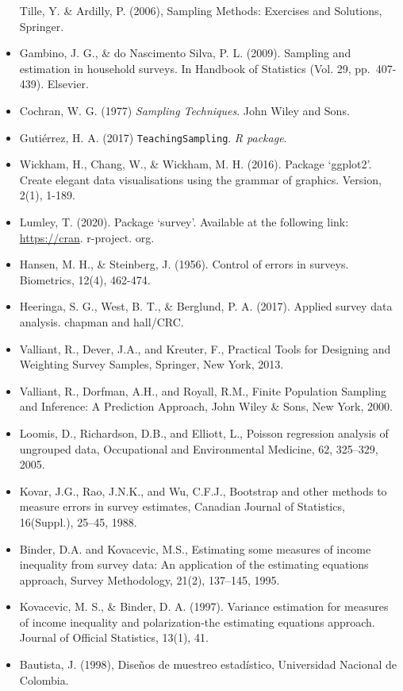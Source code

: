 \documentclass[
  12pt,
]{book}
\begin{document}
\begin{itemize}
  Tille, Y. \& Ardilly, P. (2006), Sampling Methods: Exercises and Solutions, Springer.
\item
  Gambino, J. G., \& do Nascimento Silva, P. L. (2009). Sampling and estimation in household surveys. In Handbook of Statistics (Vol. 29, pp.~407-439). Elsevier.
\item
  Cochran, W. G. (1977) \emph{Sampling Techniques}. John Wiley and Sons.
\item
  Gutiérrez, H. A. (2017) \texttt{TeachingSampling}. \emph{R package}.
\item
  Wickham, H., Chang, W., \& Wickham, M. H. (2016). Package `ggplot2'. Create elegant data visualisations using the grammar of graphics. Version, 2(1), 1-189.
\item
  Lumley, T. (2020). Package `survey'. Available at the following link: \url{https://cran}. r-project. org.
\item
  Hansen, M. H., \& Steinberg, J. (1956). Control of errors in surveys. Biometrics, 12(4), 462-474.
\item
  Heeringa, S. G., West, B. T., \& Berglund, P. A. (2017). Applied survey data analysis. chapman and hall/CRC.
\item
  Valliant, R., Dever, J.A., and Kreuter, F., Practical Tools for Designing and Weighting Survey Samples, Springer, New York, 2013.
\item
  Valliant, R., Dorfman, A.H., and Royall, R.M., Finite Population Sampling and Inference: A Prediction Approach, John Wiley \& Sons, New York, 2000.
\item
  Loomis, D., Richardson, D.B., and Elliott, L., Poisson regression analysis of ungrouped data, Occupational and Environmental Medicine, 62, 325--329, 2005.
\item
  Kovar, J.G., Rao, J.N.K., and Wu, C.F.J., Bootstrap and other methods to measure errors in survey estimates, Canadian Journal of Statistics, 16(Suppl.), 25--45, 1988.
\item
  Binder, D.A. and Kovacevic, M.S., Estimating some measures of income inequality from survey data: An application of the estimating equations approach, Survey Methodology, 21(2), 137--145, 1995.
\item
  Kovacevic, M. S., \& Binder, D. A. (1997). Variance estimation for measures of income inequality and polarization-the estimating equations approach. Journal of Official Statistics, 13(1), 41.
\item
  Bautista, J. (1998), Diseños de muestreo estadístico, Universidad Nacional de Colombia.

\end{itemize}
\end{document}
